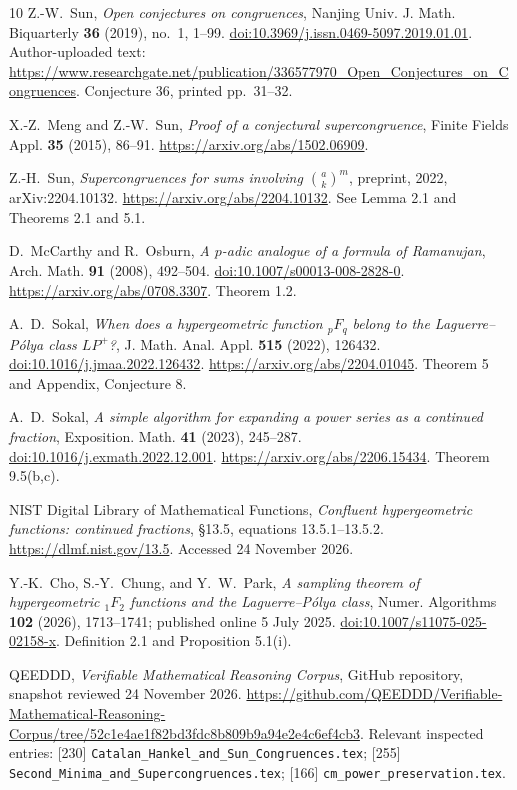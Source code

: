 \documentclass[11pt,a4paper]{article}
\theoremstyle{remark}
\begin{document}
\clearpage
\begin{thebibliography}{10}
Z.-W.~Sun, \emph{Open conjectures on congruences}, Nanjing Univ.
J. Math. Biquarterly \textbf{36} (2019), no.~1, 1--99.
\href{https://doi.org/10.3969/j.issn.0469-5097.2019.01.01}{doi:10.3969/j.issn.0469-5097.2019.01.01}.
Author-uploaded text:
\url{https://www.researchgate.net/publication/336577970_Open_Conjectures_on_Congruences}.
Conjecture 36, printed pp.~31--32.

X.-Z.~Meng and Z.-W.~Sun, \emph{Proof of a conjectural supercongruence},
Finite Fields Appl. \textbf{35} (2015), 86--91.
\url{https://arxiv.org/abs/1502.06909}.

Z.-H.~Sun, \emph{Supercongruences for sums involving
$\binom ak^m$}, preprint, 2022, arXiv:2204.10132.
\url{https://arxiv.org/abs/2204.10132}.
See Lemma 2.1 and Theorems 2.1 and 5.1.

D.~McCarthy and R.~Osburn, \emph{A $p$-adic analogue of a formula
of Ramanujan}, Arch. Math. \textbf{91} (2008), 492--504.
\href{https://doi.org/10.1007/s00013-008-2828-0}{doi:10.1007/s00013-008-2828-0}.
\url{https://arxiv.org/abs/0708.3307}. Theorem 1.2.

A.~D.~Sokal, \emph{When does a hypergeometric function ${}_pF_q$
belong to the Laguerre--P\'olya class $LP^+$?}, J. Math. Anal.
Appl. \textbf{515} (2022), 126432.
\href{https://doi.org/10.1016/j.jmaa.2022.126432}{doi:10.1016/j.jmaa.2022.126432}.
\url{https://arxiv.org/abs/2204.01045}. Theorem 5 and Appendix,
Conjecture 8.

A.~D.~Sokal, \emph{A simple algorithm for expanding a power series
as a continued fraction}, Exposition. Math. \textbf{41} (2023),
245--287.
\href{https://doi.org/10.1016/j.exmath.2022.12.001}{doi:10.1016/j.exmath.2022.12.001}.
\url{https://arxiv.org/abs/2206.15434}. Theorem 9.5(b,c).

NIST Digital Library of Mathematical Functions, \emph{Confluent
hypergeometric functions: continued fractions}, \S13.5,
equations 13.5.1--13.5.2.
\url{https://dlmf.nist.gov/13.5}. Accessed 24 November 2026.

Y.-K.~Cho, S.-Y.~Chung, and Y.~W.~Park,
\emph{A sampling theorem of hypergeometric ${}_1F_2$ functions and
the Laguerre--P\'olya class}, Numer. Algorithms \textbf{102}
(2026), 1713--1741; published online 5 July 2025.
\href{https://doi.org/10.1007/s11075-025-02158-x}{doi:10.1007/s11075-025-02158-x}.
Definition 2.1 and Proposition 5.1(i).

QEEDDD, \emph{Verifiable Mathematical Reasoning Corpus}, GitHub
repository, snapshot reviewed 24 November 2026.
\url{https://github.com/QEEDDD/Verifiable-Mathematical-Reasoning-Corpus/tree/52c1e4ae1f82bd3fdc8b809b9a94e2e4c6ef4cb3}.
Relevant inspected entries: [230] \texttt{Catalan\_Hankel\_and\_Sun\_Congruences.tex};
[255] \texttt{Second\_Minima\_and\_Supercongruences.tex};
[166] \texttt{cm\_power\_preservation.tex}.
\end{thebibliography}
\end{document}
